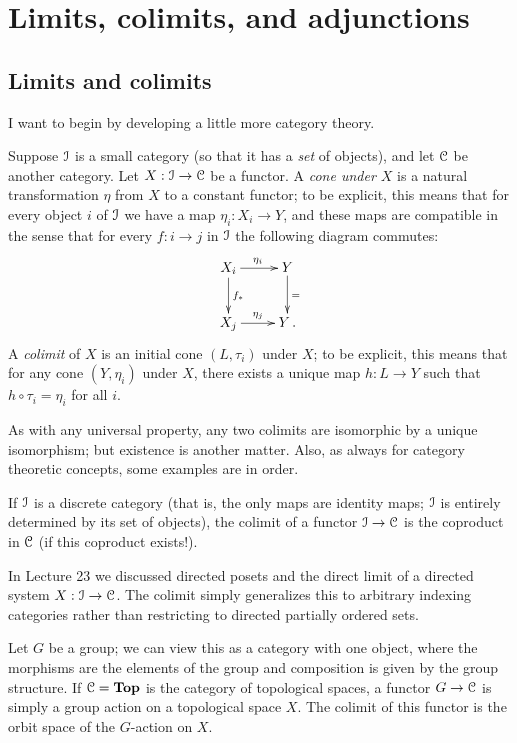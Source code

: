\section{Limits, colimits, and adjunctions}\label{906}

\subsection{Limits and colimits}

I want to begin by developing a little more category theory.

\begin{definition}
Suppose $\mathcal I$ is a small category (so that it has a \emph{set} of objects),
and let $\mathcal C$ be another category.  Let $X:\mathcal I\to\mathcal C$ be a functor.
    A \emph{cone under $X$} is a natural transformation $\eta$ from $X$ to a constant functor; to be explicit, this means that for every object $i$ of $\mathcal I$
we  have a map $\eta_i: X_i\to Y$, and these maps are compatible in the sense 
that for every $f:i\to j$ in $\mathcal I$ the following diagram commutes:
    \begin{equation*}
	\xymatrix{
	    X_i\ar[d]^{f_\ast}\ar[r]^{\eta_i} & Y \ar[d]^= \\
	    X_j\ar[r]^{\eta_j} & Y\,.
	    }
    \end{equation*}
    A \emph{colimit} of $X$ is an initial cone $(L,\tau_i)$ under $X$; to be 
    explicit, this means that for any cone $(Y,\eta_i)$ under $X$,
    there exists a unique map $h:L\to Y$ such that $h\circ \tau_i = \eta_i$
for all $i$.
\end{definition}
As with any universal property, any two colimits are isomorphic by a unique
isomorphism; but existence is another matter. Also, 
as always for category theoretic concepts, some examples are in order.
\begin{example}\label{coproductsarecolimits}
    If $\mathcal I$ is a discrete category (that is, the only maps are identity maps;
$\mathcal I$ is entirely determined by its set of objects), 
the colimit of a functor $\mathcal I\to\mathcal C$
    is the coproduct in $\mathcal C$ (if this coproduct exists!).
\end{example}
\begin{example}
In Lecture 23 we discussed directed posets and the direct limit of a directed 
system 
$X:\mathcal I\to\mathcal C$. The colimit simply generalizes this to arbitrary
indexing categories rather than restricting to directed partially 
ordered sets. 
\end{example}
\begin{example}\label{colimitgroupaction}
    Let $G$ be a group; we can view this as a category with one object, where the morphisms are the elements of the group and composition is given by the group structure.
    If $\mathcal C = \mathbf{Top}$ is the category of topological spaces, a functor $G\to \mathcal C$ is simply a
    group action on a topological space $X$.
    The colimit of this functor is the orbit space of the $G$-action on $X$.
\end{example}
